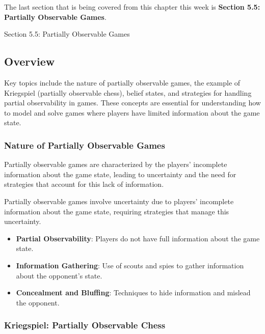 The last section that is being covered from this chapter this week is \textbf{Section 5.5: Partially Observable Games}.

\begin{notes}{Section 5.5: Partially Observable Games}
    \subsection*{Overview}

    Key topics include the nature of partially observable games, the example of Kriegspiel (partially observable chess), belief states, and strategies for handling partial observability in games. These 
    concepts are essential for understanding how to model and solve games where players have limited information about the game state.
    
    \subsubsection*{Nature of Partially Observable Games}
    
    Partially observable games are characterized by the players' incomplete information about the game state, leading to uncertainty and the need for strategies that account for this lack of information.
    
    \begin{highlight}
        Partially observable games involve uncertainty due to players' incomplete information about the game state, requiring strategies that manage this uncertainty.
        
        \begin{itemize}
            \item \textbf{Partial Observability}: Players do not have full information about the game state.
            \item \textbf{Information Gathering}: Use of scouts and spies to gather information about the opponent's state.
            \item \textbf{Concealment and Bluffing}: Techniques to hide information and mislead the opponent.
        \end{itemize}
    \end{highlight}
    
    \subsubsection*{Kriegspiel: Partially Observable Chess}
    

\end{notes}
